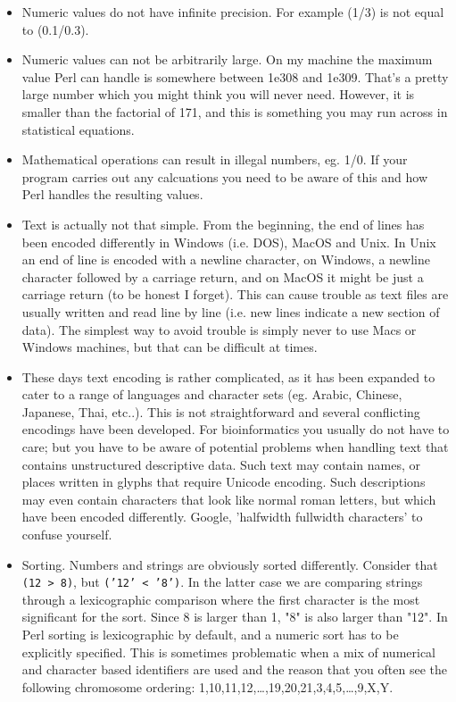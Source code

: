 \documentclass[11pt]{article}
\begin{document}
\begin{itemize}
\item Numeric values do not have infinite precision. For example (1/3) is
not equal to (0.1/0.3).

\item Numeric values can not be arbitrarily large. On my machine the
maximum value Perl can handle is somewhere between 1e308 and
1e309. That's a pretty large number which you might think 
you will never need.  However, it is smaller than the factorial of
171, and this is something you may run across in statistical
equations.

\item Mathematical operations can result in illegal numbers, eg. 1/0. If
your program carries out any calcuations you need to be aware of
this and how Perl handles the resulting values.

\item Text is actually not that simple. From the beginning, the end of
lines has been encoded differently in Windows (i.e. DOS), MacOS and
Unix. In Unix an end of line is encoded with a newline character, on
Windows, a newline character followed by a carriage return, and on
MacOS it might be just a carriage return (to be honest I
forget). This can cause trouble as text files are usually written
and read line by line (i.e.  new lines indicate a new section of
data). The simplest way to avoid trouble is simply never to use
Macs or Windows machines, but that can be difficult at times.

\item These days text encoding is rather complicated, as it has been
expanded to cater to a range of languages and character sets
(eg. Arabic, Chinese, Japanese, Thai, etc..). This is not
straightforward and several conflicting encodings have been
developed. For bioinformatics you usually do not have to care; but
you have to be aware of potential problems when handling text that
contains unstructured descriptive data. Such text may contain
names, or places written in glyphs that require Unicode
encoding. Such descriptions may even contain characters that look
like normal roman letters, but which have been encoded differently.
Google, 'halfwidth fullwidth characters' to confuse yourself.

\item Sorting. Numbers and strings are obviously sorted
differently. Consider that \texttt{(12 > 8)}, but \texttt{('12' < '8')}. In the latter
case we are comparing strings through a lexicographic comparison
where the first character is the most significant for the
sort. Since 8 is larger than 1, "8" is also larger than "12". In
Perl sorting is lexicographic by default, and a numeric sort has to
be explicitly specified. This is sometimes problematic when a mix of
numerical and character based identifiers are used and the reason
that you often see the following chromosome ordering:
1,10,11,12,\ldots{},19,20,21,3,4,5,\ldots{},9,X,Y.
\end{itemize}
\end{document}
